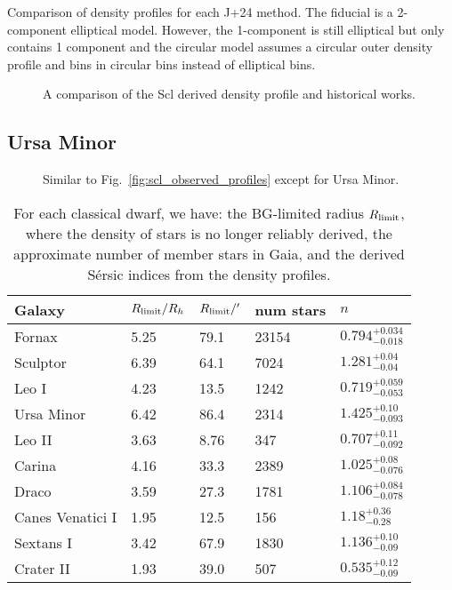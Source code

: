Comparison of density profiles for each J+24 method. The fiducial is a
2-component elliptical model. However, the 1-component is still
elliptical but only contains 1 component and the circular model assumes
a circular outer density profile and bins in circular bins instead of
elliptical bins.

\begin{figure}
\centering
{}
\caption[Scl literature density profiles]{A comparison of the Scl
derived density profile and historical works.}
\end{figure}

\subsection{Ursa Minor}\label{ursa-minor}

\begin{figure}
\centering
{}
\caption[UMi density comparison]{Similar to
Fig.~\ref{fig:scl_observed_profiles} except for Ursa
Minor.}\label{fig:umi_density_extras}
\end{figure}

\begin{table*}[t]
\centering
\caption[Properties of probabilistically-derived density profiles]{For each classical dwarf, we have: the BG-limited radius $R_{\rm limit}$, where the density of stars is no longer reliably derived, the approximate number of member stars in Gaia, and the derived Sérsic indices from the density profiles. }
\label{tbl:mcmc_props}
\begin{tabular}{lllll}
\toprule
Galaxy & $R_{\rm limit} / R_h$ & $R_{\rm limit} / '$ & num stars & $n$\\
\midrule
Fornax & 5.25 & 79.1 & 23154 & $0.794^{+0.034}_{-0.018}$\\
Sculptor & 6.39 & 64.1 & 7024 & $1.281^{+0.04}_{-0.04}$\\
Leo I & 4.23 & 13.5 & 1242 & $0.719^{+0.059}_{-0.053}$\\
Ursa Minor & 6.42 & 86.4 & 2314 & $1.425^{+0.10}_{-0.093}$\\
Leo II & 3.63 & 8.76 & 347 & $0.707^{+0.11}_{-0.092}$\\
Carina & 4.16 & 33.3 & 2389 & $1.025^{+0.08}_{-0.076}$\\
Draco & 3.59 & 27.3 & 1781 & $1.106^{+0.084}_{-0.078}$\\
Canes Venatici I & 1.95 & 12.5 & 156 & $1.18^{+0.36}_{-0.28}$\\
Sextans I & 3.42 & 67.9 & 1830 & $1.136^{+0.10}_{-0.09}$\\
Crater II & 1.93 & 39.0 & 507 & $0.535^{+0.12}_{-0.09}$\\
\bottomrule
\end{tabular}
\end{table*}

